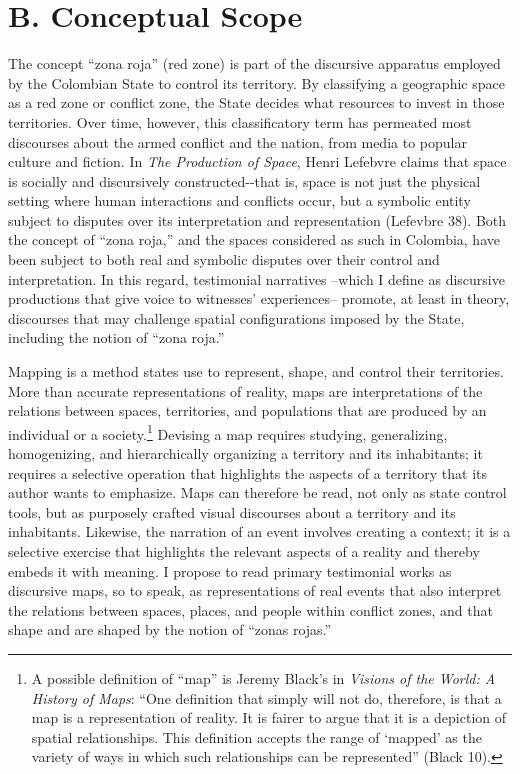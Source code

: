 \documentclass[
  11pt,
,
onecolumn,
openany
]{book}
\begin{document}
\hypertarget{b.-conceptual-scope}{%
\section{B. Conceptual Scope}\label{b.-conceptual-scope}}

The concept ``zona roja'' (red zone) is part of the discursive apparatus
employed by the Colombian State to control its territory. By classifying a
geographic space as a red zone or conflict zone, the State decides what
resources to invest in those territories. Over time, however, this
classificatory term has permeated most discourses about the armed conflict and
the nation, from media to popular culture and fiction. In \emph{The Production
of Space}, Henri Lefebvre claims that space is socially and discursively
constructed-\/-that is, space is not just the physical setting where human
interactions and conflicts occur, but a symbolic entity subject to disputes
over its interpretation and representation (Lefevbre 38). Both the concept of
``zona roja,'' and the spaces considered as such in Colombia, have been
subject to both real and symbolic disputes over their control and
interpretation. In this regard, testimonial narratives --which I define as
discursive productions that give voice to witnesses' experiences-- promote, at
least in theory, discourses that may challenge spatial configurations imposed
by the State, including the notion of ``zona roja.''

Mapping is a method states use to represent, shape, and control their
territories. More than accurate representations of reality, maps are
interpretations of the relations between spaces, territories, and populations
that are produced by an individual or a society.\footnote{A possible
  definition of ``map'' is Jeremy Black's in \emph{Visions of the World: A
  History of Maps}: ``One definition that simply will not do, therefore, is
  that a map is a representation of reality. It is fairer to argue that it is
  a depiction of spatial relationships. This definition accepts the range of
  `mapped' as the variety of ways in which such relationships can be
  represented'' (Black 10).} Devising a map requires studying, generalizing,
homogenizing, and hierarchically organizing a territory and its inhabitants;
it requires a selective operation that highlights the aspects of a territory
that its author wants to emphasize. Maps can therefore be read, not only as
state control tools, but as purposely crafted visual discourses about a
territory and its inhabitants. Likewise, the narration of an event involves
creating a context; it is a selective exercise that highlights the relevant
aspects of a reality and thereby embeds it with meaning. I propose to read
primary testimonial works as discursive maps, so to speak, as representations
of real events that also interpret the relations between spaces, places, and
people within conflict zones, and that shape and are shaped by the notion of
``zonas rojas.''
\end{document}
